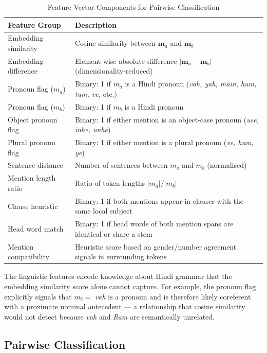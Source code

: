 \documentclass[12pt,a4paper]{report}
\begin{document}
\begin{table}[H]
\centering
\caption{Feature Vector Components for Pairwise Classification}
\begin{tabular}{|l|p{8cm}|}
\hline
\textbf{Feature Group} & \textbf{Description} \\
\hline
Embedding similarity & Cosine similarity between $\mathbf{m}_a$ and $\mathbf{m}_b$ \\
Embedding difference & Element-wise absolute difference $|\mathbf{m}_a - \mathbf{m}_b|$ (dimensionality-reduced) \\
Pronoun flag ($m_a$) & Binary: 1 if $m_a$ is a Hindi pronoun (\textit{vah, yah, main, hum, tum, ve,} etc.) \\
Pronoun flag ($m_b$) & Binary: 1 if $m_b$ is a Hindi pronoun \\
Object pronoun flag & Binary: 1 if either mention is an object-case pronoun (\textit{use, inhe, unhe}) \\
Plural pronoun flag & Binary: 1 if either mention is a plural pronoun (\textit{ve, hum, ye}) \\
Sentence distance & Number of sentences between $m_a$ and $m_b$ (normalised) \\
Mention length ratio & Ratio of token lengths $|m_a| / |m_b|$ \\
Clause heuristic & Binary: 1 if both mentions appear in clauses with the same local subject \\
Head word match & Binary: 1 if head words of both mention spans are identical or share a stem \\
Mention compatibility & Heuristic score based on gender/number agreement signals in surrounding tokens \\
\hline
\end{tabular}
\end{table}

The linguistic features encode knowledge about Hindi grammar that the embedding similarity score alone cannot capture. For example, the pronoun flag explicitly signals that $m_b = $ \textit{vah} is a pronoun and is therefore likely coreferent with a proximate nominal antecedent --- a relationship that cosine similarity would not detect because \textit{vah} and \textit{Ram} are semantically unrelated.

\subsection{Pairwise Classification}
\end{document}
